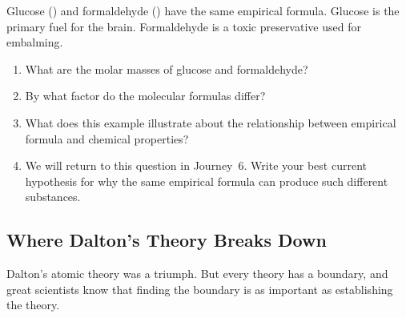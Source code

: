 \documentclass[12pt, a4paper]{book}
\theoremstyle{definition}
\begin{document}
\begin{puzzlebox}
Glucose () and formaldehyde ()
have the same empirical formula.
Glucose is the primary fuel for the brain.
Formaldehyde is a toxic preservative used for embalming.

\begin{enumerate}[label=(\alph*), leftmargin=*]
  \item What are the molar masses of glucose and formaldehyde?
  \item By what factor do the molecular formulas differ?
  \item What does this example illustrate about the relationship
        between empirical formula and chemical properties?
  \item We will return to this question in Journey~6.
        Write your best current hypothesis for why the
        same empirical formula can produce such different substances.
\end{enumerate}
\end{puzzlebox}

\subsection{Where Dalton's Theory Breaks Down}

Dalton's atomic theory was a triumph.
But every theory has a boundary,
and great scientists know that finding the boundary
is as important as establishing the theory.
\end{document}
